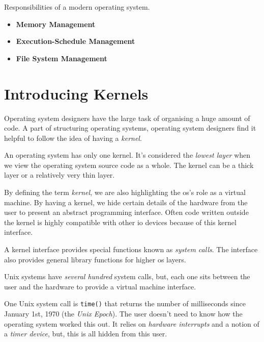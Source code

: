 Responsibilities of a modern operating system.
\begin{itemize}   
\renewcommand{\labelitemi}{$\Box$}
\item \textbf{Memory Management} %
\item \textbf{Execution-Schedule Management} 
\item \textbf{File System Management} 
\end{itemize}



\section{Introducing Kernels}

Operating system designers have the large task of 
organising a huge amount of code. 
A part of structuring operating systems,
operating system designers find it helpful to follow the idea of having a \textit{kernel}.


An operating system has only one kernel.
It's considered the \textit{lowest layer} 
when we view the operating system source code as a whole. 
The kernel can be a thick layer or a relatively very thin layer. 






By defining the term \textit{kernel}, we are also highlighting
the os's role as a virtual machine. 
By having a kernel, we hide certain details of the hardware from the user to present an 
abstract programming interface. Often code written outside the kernel is 
highly compatible with other io devices because of this kernel interface. 

A kernel interface provides special functions known as \textit{system calls}.
The interface also provides general library functions for higher os layers. 








Unix systems have \textit{several hundred} system calls, but, each one 
sits between the user and the hardware to provide a virtual machine interface.  

\begin{example}
One Unix system call is \lstinline{time()} that returns the number of milliseconds 
since January 1st, 1970 (the \textit{Unix Epoch}). The user doesn't need to know 
how the operating system worked this out. It relies on \textit{hardware interrupts}
and a notion of a \textit{timer device}, but, this is all hidden from this user. 
\end{example}

